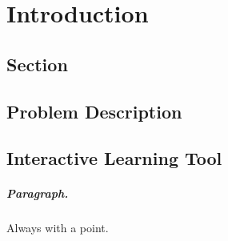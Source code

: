 \chapter{Introduction}
\label{chap:intro}
\section{Section}
\section{Problem Description}

\section{Interactive Learning Tool}

\paragraph{Paragraph.} Always with a point.

